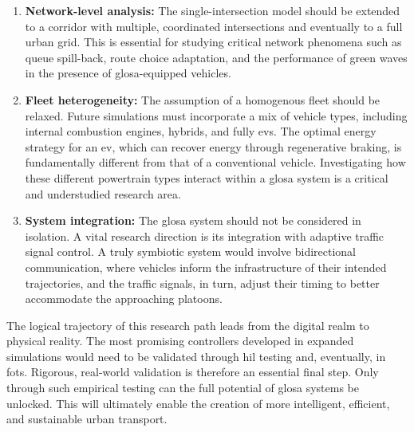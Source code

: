\begin{enumerate}
    \item \textbf{Network-level analysis:} The single-intersection model should be extended to a corridor with multiple, coordinated intersections and eventually to a full urban grid. This is essential for studying critical network phenomena such as queue spill-back, route choice adaptation, and the performance of green waves in the presence of \ac{glosa}-equipped vehicles.
    \item \textbf{Fleet heterogeneity:} The assumption of a homogenous fleet should be relaxed. Future simulations must incorporate a mix of vehicle types, including internal combustion engines, hybrids, and fully \acp{ev}. The optimal energy strategy for an \ac{ev}, which can recover energy through regenerative braking, is fundamentally different from that of a conventional vehicle. Investigating how these different powertrain types interact within a \ac{glosa} system is a critical and understudied research area.
    \item \textbf{System integration:} The \ac{glosa} system should not be considered in isolation. A vital research direction is its integration with adaptive traffic signal control. A truly symbiotic system would involve bidirectional communication, where vehicles inform the infrastructure of their intended trajectories, and the traffic signals, in turn, adjust their timing to better accommodate the approaching platoons.
\end{enumerate}

The logical trajectory of this research path leads from the digital realm to physical reality. The most promising controllers developed in expanded simulations would need to be validated through \ac{hil} testing and, eventually, in \acp{fot}. Rigorous, real-world validation is therefore an essential final step. Only through such empirical testing can the full potential of \ac{glosa} systems be unlocked. This will ultimately enable the creation of more intelligent, efficient, and sustainable urban transport.